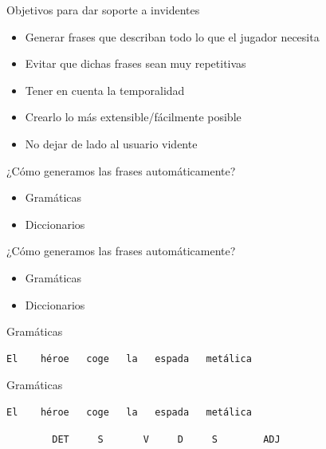 \begin{tframe}{Objetivos para dar soporte a invidentes}
	\begin{itemize}
		\item Generar frases que describan todo lo que el jugador necesita
		\item Evitar que dichas frases sean muy repetitivas
		\item Tener en cuenta la temporalidad
		\item Crearlo lo más extensible/fácilmente posible
		\item<+-| alert@+> No dejar de lado al usuario vidente
	\end{itemize}
\end{tframe}


\begin{tframe}{¿Cómo generamos las frases automáticamente?}
	\begin{itemize}
		\item Gramáticas
		\item Diccionarios
	\end{itemize}
\end{tframe}

\begin{tframe}{¿Cómo generamos las frases automáticamente?}
	\begin{itemize}
		\item<+-| alert@+> Gramáticas
		\item Diccionarios
	\end{itemize}
\end{tframe}

\begin{frame}[t, fragile]{Gramáticas}
	\vspace*{\fill}
	\begin{Verbatim}
El    héroe   coge   la   espada   metálica
	\end{Verbatim}
	\vspace*{\fill}
\end{frame}

\begin{frame}[t, fragile]{Gramáticas}
	\vspace*{\fill}
	\begin{Verbatim}
El    héroe   coge   la   espada   metálica
	\end{Verbatim}
	\begin{verbatim}
		DET     S       V     D     S        ADJ
	\end{verbatim}
	\vspace*{\fill}
\end{frame}

